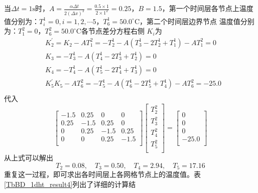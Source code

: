 当$\Delta t=1\mathrm{s}$时，$A=\frac{\alpha\Delta t}{2(\Delta
x)^{2}}=\frac{0.5\times1}{2\times1^{2}}=0.25$，$B=1.5$，第一个时间层各节点上温度
值分别为：$T_{i}^{1}=0, i=1,2,\cdots 5$，$T_{6}^{1}=50.0^{\circ}\!\mathrm{C}$，第二个时间层边界节点
温度值分别为：$T_{1}^{2}=0$，$T_{6}^{2}=50.0^{\circ}\!\mathrm{C}$各节点差分方程右侧
$K_{i}$为
\begin{equation}
\begin{aligned}
    &K_{2}^{\prime} =
    K_{2} - AT_{1}^{2}
    =
  -T_{2}^{1}
  -
  A(T_{3}^{1} - 2T_{2}^{1} + T_{1}^{1})
  - AT_{1}^{2}
  =
  0
    \\
    &K_{3} 
    =
  -T_{3}^{1}
  -
  A(T_{4}^{1} - 2T_{3}^{1} + T_{2}^{1})
  =
  0
    \\
    &K_{4}
    =
  -T_{4}^{1}
  -
  A(T_{5}^{1} - 2T_{4}^{1} + T_{3}^{1})
  =
  0
    \\
    &K_{5}^{\prime} 
    K_{5} - AT_{6}^{2}
    =
  -T_{5}^{1}
  -
  A(T_{6}^{1} - 2T_{5}^{1} + T_{4}^{1})
  - AT_{6}^{2}
  =
  -25.0
    \\
\end{aligned}
\end{equation}
代入
\begin{equation}
  \begin{bmatrix}
    -1.5 & 0.25 & 0 & 0 \\
    0.25 & -1.5 & 0.25 & 0 \\
    0 & 0.25 & -1.5 & 0.25 \\
    0 & 0 & 0.25 & -1.5 \\
  \end{bmatrix}
  \begin{bmatrix}
    T_{2}^{2} \\
    T_{3}^{2} \\
    T_{4}^{2} \\
    T_{5}^{2} \\
  \end{bmatrix}
  =
  \begin{bmatrix}
    0 \\
    0 \\
    0 \\
    -25.0 \\
  \end{bmatrix}
\end{equation}
从上式可以解出
\begin{equation}
  T_{2} = 0.08, \quad
  T_{3} = 0.50, \quad
  T_{4} = 2.94, \quad
  T_{5} = 17.16
\end{equation}
重复这一过程，即可求出各时间层上各网格节点上的温度值。表\ref{TbBD_1dht_result4}列出了详细的计算结
